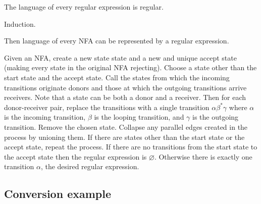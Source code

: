 \documentclass{notes}
\begin{document}
\begin{thm}
  The language of every regular expression is regular.
\end{thm}

\begin{prf}
  Induction.
\end{prf}

\begin{thm}
  Then language of every NFA can be represented by a regular expression.
\end{thm}

\begin{prf}
  Given an NFA, create a new state state and a new and unique accept state (making every state in the original NFA rejecting).
  Choose a state other than the start state and the accept state.
  Call the states from which the incoming transitions originate donors and those at which the outgoing transitions arrive receivers.
  Note that a state can be both a donor and a receiver.
  Then for each donor-receiver pair, replace the transitions with a single transition $\alpha \beta^* \gamma$ where $\alpha$ is the incoming transition, $\beta$ is the looping transition, and $\gamma$ is the outgoing transition.
  Remove the chosen state.
  Collapse any parallel edges created in the process by unioning them.
  If there are states other than the start state or the accept state, repeat the process.
  If there are no transitions from the start state to the accept state then the regular expression is $\varnothing$.
  Otherwise there is exactly one transition $\alpha$, the desired regular expression.
\end{prf}

\newpage

\subsection{Conversion example}

\begin{center}
\end{center}
\end{document}
